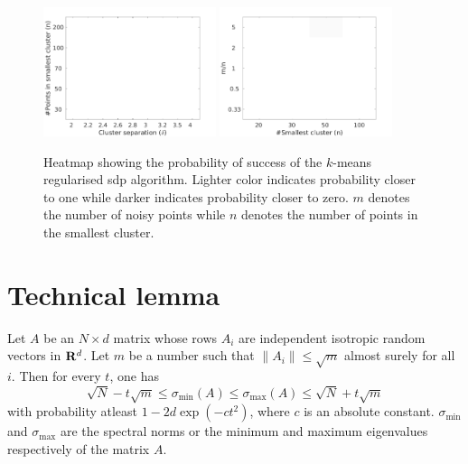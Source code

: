 \begin{figure}
  \includegraphics[width=0.45\textwidth]{figures/optimizationClustering/deltan.png}
  \includegraphics[width=0.45\textwidth]{figures/optimizationClustering/nM.png}
  \caption{Heatmap showing the probability of success of the $k$-means regularised sdp algorithm. Lighter color indicates probability closer to one while darker indicates probability closer to zero. $m$ denotes the number of noisy points while $n$ denotes the number of points in the smallest cluster.}  
\end{figure}

\section{Technical lemma}
\begin{theorem}
\label{a-thm:spectralNormCOncentration}
Let $A$ be an $N\times d$ matrix whose rows $A_i$ are independent isotropic random vectors in $\mathbf R^d$. Let $m$ be a number such that $\|A_i\| \le \sqrt{m}$ almost surely for all $i$. Then for every $t$, one has
$$\sqrt{N} - t\sqrt{m} \le \sigma_{\min}(A) \le \sigma_{\max}(A) \le \sqrt{N} + t\sqrt{m}$$
with probability atleast $1-2d\exp(-ct^2)$, where $c$ is an absolute constant. $\sigma_{\min}$ and $\sigma_{\max}$ are the spectral norms or the minimum and maximum eigenvalues respectively of the matrix $A$.
\end{theorem}
